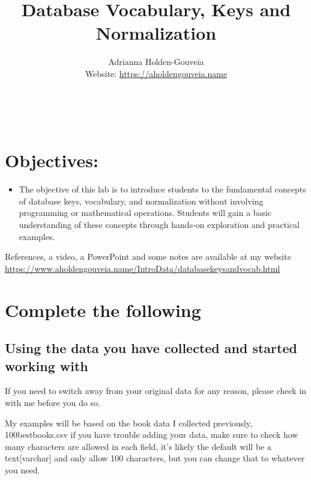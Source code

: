 \documentclass[12pt]{article}
\title{Database Vocabulary, Keys and Normalization}
\author{
        Adrianna Holden-Gouveia \\
        Website: \url{https://aholdengouveia.name}\\ 
        \date{\vspace{-5ex}}
        \faLinkedin{: aholdengouveia} \\
        \faGithub {: aholdengouveia} \\
        }
\begin{document}
    

\maketitle


\section*{Objectives:}
\begin{itemize}
    \item The objective of this lab is to introduce students to the fundamental concepts of database keys, vocabulary, and normalization without involving programming or mathematical operations. Students will gain a basic understanding of these concepts through hands-on exploration and practical examples.
\end{itemize}

References, a video, a PowerPoint and some notes are available at my website \url {https://www.aholdengouveia.name/IntroData/databasekeysandvocab.html}


\section*{Complete the following}


\subsection*{Using the data you have collected and started working with}

If you need to switch away from your original data for any reason, please check in with me before you do so. 

My examples will be based on the book data I collected previously, 100bestbooks.csv if you have trouble adding your data, make sure to check how many characters are allowed in each field, it's likely the default will be a text[varchar] and only allow 100 characters, but you can change that to whatever you need. 
\end{document}
